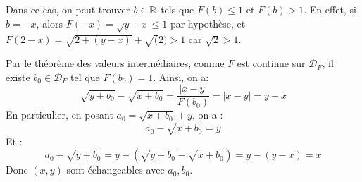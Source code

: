 \documentclass[]{../templates/homework}
\begin{document}
Dans ce cas, on peut trouver $b\in\mathbb R$ tels que $F(b) \leq 1$ et $F(b) > 1$. En effet, si $b=-x$, alors $F(-x) = \sqrt{y-x} \leq 1$ par hypothèse, et $F(2-x) = \sqrt{2+(y-x)} + \sqrt(2) > 1$ car $\sqrt{2} > 1$.

Par le théorème des valeurs intermédiaires, comme $F$ est continue sur $\mathcal D_F$, il existe $b_0 \in \mathcal D_F$ tel que $F(b_0) = 1$. Ainsi, on a:
\begin{equation*}
	\sqrt{y+b_0} - \sqrt{x+b_0} = \frac{|x-y|}{F(b_0)} = |x-y| = y-x
\end{equation*}
En particulier, en posant $a_0 = \sqrt{x+b_0} + y$, on a : $$a_0 - \sqrt{x+b_0} = y$$
Et :$$a_0 - \sqrt{y+b_0} = y - (\sqrt{y+b_0} - \sqrt{x+b_0}) = y - (y-x) = x$$
Donc $(x,y)$ sont échangeables avec $a_0, b_0$.
\end{document}

